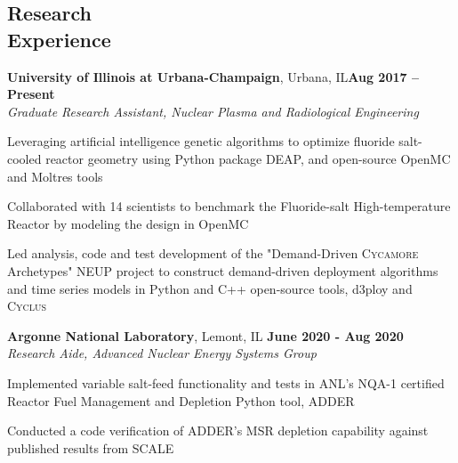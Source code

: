 \documentclass[margin,line]{resume}
\newcommand{\Cyclus}{\textsc{Cyclus}\xspace}%
\begin{document}
\begin{resume}
    \section{\mysidestyle Research\\Experience}
    \textbf{University of Illinois at Urbana-Champaign}, Urbana, IL\hfill \textbf{Aug 2017 -- Present}\\
		\textsl{Graduate Research Assistant, Nuclear Plasma and Radiological Engineering}\\\vspace{-3.7mm}
                \begin{list2}
                        \item Leveraging artificial intelligence genetic algorithms to optimize fluoride salt-cooled 
                        reactor geometry using Python package DEAP, 
                        and open-source OpenMC and Moltres tools
                        \item Collaborated with 14 scientists to benchmark the Fluoride-salt High-temperature 
                        Reactor by modeling the design in OpenMC
                        \item Led analysis, code and test development of the "Demand-Driven \textsc{Cycamore} Archetypes" 
                        NEUP project to construct demand-driven deployment algorithms and time series models in 
                        Python and C++ open-source tools, d3ploy and \Cyclus
                \end{list2}\vspace{-1.5mm}

\textbf{Argonne National Laboratory}, Lemont, IL \hfill \textbf{June 2020 - Aug 2020}\\\vspace{-4mm}%
		\textsl{Research Aide, Advanced Nuclear Energy Systems Group}\\
                \begin{list2}
                        \item Implemented variable salt-feed functionality and tests in ANL's NQA-1 certified Reactor Fuel Management 
                        and Depletion Python tool, ADDER
                        \item Conducted a code verification of ADDER's MSR depletion capability against published results from SCALE 
                \end{list2}\vspace{-1.5mm}


\end{resume}
\end{document}
